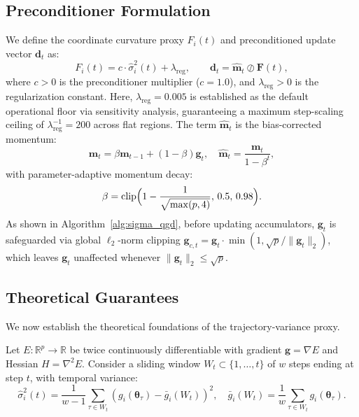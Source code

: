 \documentclass[sn-mathphys,Numbered]{sn-jnl}
\theoremstyle{thmstyleone}
\theoremstyle{thmstyletwo}
\theoremstyle{thmstylethree}
\begin{document}
\subsection{Preconditioner Formulation}
We define the coordinate curvature proxy $F_i(t)$ and preconditioned update vector $\mathbf{d}_t$ as:
\begin{equation}
F_i(t) = c \cdot \hat{\sigma}_i^2(t) + \lambda_{\text{reg}}, \qquad \mathbf{d}_t = \hat{\mathbf{m}}_t \oslash \mathbf{F}(t),
\label{eq:preconditioned_update}
\end{equation}
where $c > 0$ is the preconditioner multiplier ($c = 1.0$), and $\lambda_{\text{reg}} > 0$ is the regularization constant. Here, $\lambda_{\text{reg}} = 0.005$ is established as the default operational floor via sensitivity analysis, guaranteeing a maximum step-scaling ceiling of $\lambda_{\text{reg}}^{-1} = 200$ across flat regions. The term $\hat{\mathbf{m}}_t$ is the bias-corrected momentum:
\begin{equation}
\mathbf{m}_t = \beta \mathbf{m}_{t-1} + (1-\beta)\mathbf{g}_t, \quad \hat{\mathbf{m}}_t = \frac{\mathbf{m}_t}{1 - \beta^t},
\label{eq:momentum}
\end{equation}
with parameter-adaptive momentum decay:
\begin{equation}
\beta = \operatorname{clip}\Bigl(1 - \frac{1}{\sqrt{\max(p, 4)}}, \, 0.5, \, 0.98\Bigr).
\label{eq:beta_formula}
\end{equation}
As shown in Algorithm~\ref{alg:sigma_qgd}, before updating accumulators, $\mathbf{g}_t$ is safeguarded via global $\ell_2$-norm clipping $\mathbf{g}_{c,t} = \mathbf{g}_t \cdot \min(1, \sqrt{p}/\|\mathbf{g}_t\|_2)$, which leaves $\mathbf{g}_t$ unaffected whenever $\|\mathbf{g}_t\|_2 \le \sqrt{p}$.

\subsection{Theoretical Guarantees}
We now establish the theoretical foundations of the trajectory-variance proxy.

Let $E: \mathbb{R}^p \to \mathbb{R}$ be twice continuously differentiable with gradient $\mathbf{g} = \nabla E$ and Hessian $H = \nabla^2 E$. Consider a sliding window $W_t \subset \{1, \dots, t\}$ of $w$ steps ending at step $t$, with temporal variance:
\begin{equation}
\hat{\sigma}_i^2(t) = \frac{1}{w-1} \sum_{\tau \in W_t} \left( g_i(\boldsymbol{\theta}_\tau) - \bar{g}_i(W_t) \right)^2, \quad \bar{g}_i(W_t) = \frac{1}{w} \sum_{\tau \in W_t} g_i(\boldsymbol{\theta}_\tau).
\end{equation}
\end{document}
